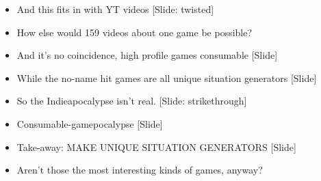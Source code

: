 \documentclass[12pt]{article}
\begin{document}
{\begin{itemize}
\item And this fits in with YT videos [Slide: twisted]

\item How else would 159 videos about one game be possible?

\item And it's no coincidence, high profile games consumable [Slide]

\item While the no-name hit games are all unique situation generators [Slide]

\item So the Indieapocalypse isn't real. [Slide: strikethrough]

\item Consumable-gamepocalypse [Slide]

\item Take-away:  MAKE UNIQUE SITUATION GENERATORS [Slide]

\item Aren't those the most interesting kinds of games, anyway?

\end{itemize}

}
\end{document}
